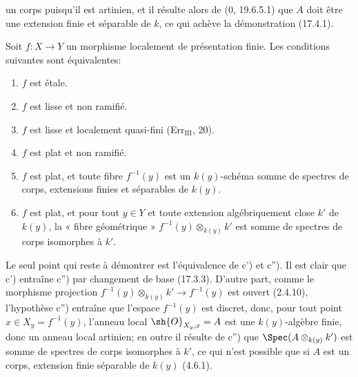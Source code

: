 un corps puisqu'il est artinien, et il résulte alors de (0, 19.6.5.1) que $A$ doit être une extension finie et séparable de $k$, ce qui achève la démonstration (17.4.1).

\begin{corollary}[17.6.2]
\label{IV.17.6.2}
Soit $f:X\to Y$ un morphisme localement de présentation finie. Les conditions suivantes sont équivalentes:
\begin{enumerate}
  \item[a)] $f$ est étale.
  \item[a')] $f$ est lisse et non ramifié.
  \item[b)] $f$ est lisse et localement quasi-fini (Err$_{\mathrm{III}}$, 20).
  \item[c)] $f$ est plat et non ramifié.
  \item[c')] $f$ est plat, et toute fibre $f^{-1}(y)$ est un $k(y)$-schéma somme de spectres de corps, extensions finies et séparables de $k(y)$.
  \item[c'')] $f$ est plat, et pour tout $y\in Y$ et toute extension algébriquement close $k'$ de $k(y)$, la « fibre géométrique » $f^{-1}(y)\otimes_{k(y)}k'$ est somme de spectres de corps isomorphes à $k'$.
\end{enumerate}
\end{corollary}

Le seul point qui reste à démontrer est l'équivalence de c') et c''). Il est clair que c') entraîne c'') par changement de base (17.3.3). D'autre part, comme le morphisme projection $f^{-1}(y)\otimes_{k(y)}k'\to f^{-1}(y)$ est ouvert (2.4.10), l'hypothèse c'') entraîne que l'espace $f^{-1}(y)$ est discret, donc, pour tout point $x\in X_y=f^{-1}(y)$, l'anneau local $\sh{O}_{X_y,x}=A$ est une $k(y)$-algèbre finie, donc un anneau local artinien; en outre il résulte de c'') que $\Spec(A\otimes_{k(y)}k')$ est somme de spectres de corps isomorphes à $k'$, ce qui n'est possible que si $A$ est un corps, extension finie séparable de $k(y)$ (4.6.1).

